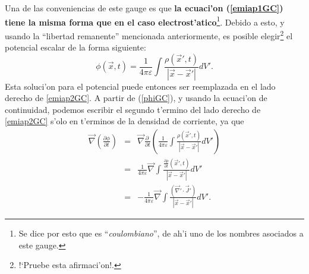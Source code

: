 Una de las conveniencias de este gauge es que \textbf{la ecuaci'on (\ref{emiap1GC}) tiene la misma forma que en el caso electrost'atico}\footnote{Se dice por esto que es ``\textit{coulombiano}'', de ah'i uno de los nombres asociados a este gauge.}. Debido a esto, y usando la ``libertad remanente'' mencionada anteriormente, es posible elegir\footnote{!`Pruebe esta afirmaci'on!.} el potencial escalar de la forma siguiente:
\begin{equation}\label{phiGC}
\boxed{ \phi(\vec{x},t)=\frac{1}{4\pi\varepsilon}\int\frac{\rho(\vec{x}',t)}{\left|\vec{x}-\vec{x}'\right|}dV'.}
\end{equation}
Esta soluci'on para el potencial puede entonces ser reemplazada en el lado derecho de \eqref{emiap2GC}. 
A partir de (\ref{phiGC}), y usando la ecuaci'on de continuidad, podemos escribir el segundo t'ermino del lado derecho de \eqref{emiap2GC} s'olo en t'erminos de la densidad de corriente, ya que
\begin{eqnarray}
\vec{\nabla}\left(\frac{\partial\phi }{\partial t}\right)&=&  \vec{\nabla}\frac{\partial\ }{\partial t}\left(\frac{1}{4\pi\varepsilon}\int\frac{\rho(\vec{x}',t)}{\left|\vec{x}-\vec{x}'\right|}dV'\right) \\
&=&  \frac{1}{4\pi\varepsilon}\vec{\nabla}\int\frac{\frac{\partial\rho }{\partial t}(\vec{x}',t)}{\left|\vec{x}-\vec{x}'\right|}dV' \\
&=& - \frac{1}{4\pi\varepsilon} \vec{\nabla}\int\frac{(\vec{\nabla}'\cdot\vec{J}')}{\left|\vec{x}-\vec{x}'\right|}dV' .%
\end{eqnarray}
